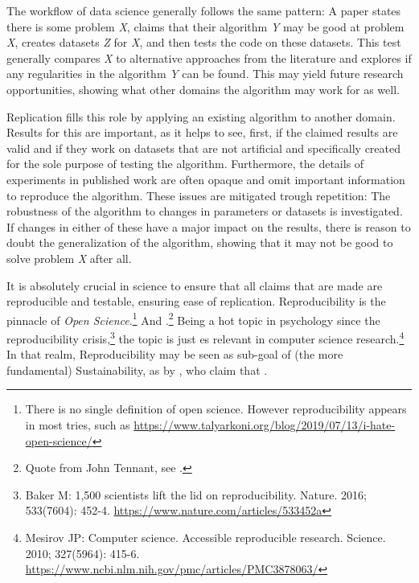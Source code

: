 
The workflow of data science generally follows the same pattern: A paper states there is some problem \textit{X}, claims that their algorithm \textit{Y} may be good at problem \textit{X}, creates datasets \textit{Z} for \textit{X}, and then tests the code on these datasets. This test generally compares \textit{X} to alternative approaches from the literature and explores if any regularities in the algorithm \textit{Y} can be found. This may yield future research opportunities, showing what other domains the algorithm may work for as well.

Replication fills this role by applying an existing algorithm to another domain. Results for this are important, as it helps to see, first, if the claimed results are valid and if they work on datasets that are not artificial and specifically created for the sole purpose of testing the algorithm. Furthermore, the details of experiments in published work are often opaque and omit important information to reproduce the algorithm. These issues are mitigated trough repetition: The robustness of the algorithm to changes in parameters or datasets is investigated. If changes in either of these have a major impact on the results, there is reason to doubt the generalization of the algorithm, showing that it may not be good to solve problem \textit{X} after all.

It is absolutely crucial in science to ensure that all claims that are made are reproducible and testable, ensuring ease of replication. Reproducibility is the pinnacle of \textit{Open Science}.\footnote{There is no single definition of open science. However reproducibility appears in most tries, such as \eg \url{https://www.talyarkoni.org/blog/2019/07/13/i-hate-open-science/} } And .\footnote{Quote from John Tennant, see \eg {} .} 
Being a hot topic in psychology since the reproducibility crisis,\footnote{Baker M: 1,500 scientists lift the lid on reproducibility. Nature. 2016; 533(7604): 452-4. \url{https://www.nature.com/articles/533452a} } the topic is just es relevant in computer science research.\footnote{Mesirov JP: Computer science. Accessible reproducible research. Science. 2010; 327(5964): 415-6. \url{https://www.ncbi.nlm.nih.gov/pmc/articles/PMC3878063/} } In that realm, Reproducibility may be seen as sub-goal of (the more fundamental) Sustainability, as \eg by \textcite{Molder2021a}, who claim that .

